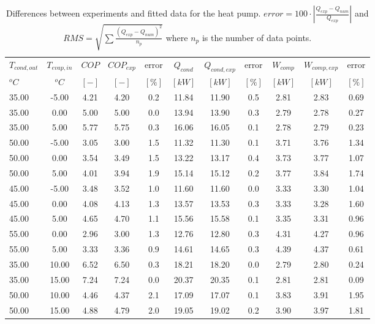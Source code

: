 \documentclass[english]{SPFShortReport}
\begin{document}
\begin{table}[!ht]
\begin{small}
\caption{Differences between experiments and fitted data for the heat pump.          $error=100 \cdot |\frac{Q_{exp}-Q_{num}}{Q_{exp}}|$ and $RMS = \sqrt { \sum{\frac{(Q_{exp}-Q_{num})^2}{n_p}} }$ where $n_p$ is the number of data points.}
\begin{center}
\resizebox{12cm}{!} 
{
\begin{tabular}{l | c c c c c c c c c c } 
\hline
\hline
$T_{cond,out}$ &$T_{evap,in}$ &$COP$ &$COP_{exp}$ &error &$Q_{cond}$ &$Q_{cond,exp}$ &error &$W_{comp}$ &$W_{comp,exp}$ &error \\ 
$^oC$ &$^oC$ &$[-]$ &$[-]$ &$[\%]$ &$[kW]$ &$[kW]$ &$[\%]$ &$[kW]$ &$[kW]$ &$[\%]$\\ 
\hline
35.00  & -5.00 & 4.21 & 4.20 & 0.2 & 11.84 & 11.90 & 0.5 & 2.81 & 2.83 & 0.69\\ 
35.00  & 0.00 & 5.00 & 5.00 & 0.0 & 13.94 & 13.90 & 0.3 & 2.79 & 2.78 & 0.27\\ 
35.00  & 5.00 & 5.77 & 5.75 & 0.3 & 16.06 & 16.05 & 0.1 & 2.78 & 2.79 & 0.23\\ 
50.00  & -5.00 & 3.05 & 3.00 & 1.5 & 11.32 & 11.30 & 0.1 & 3.71 & 3.76 & 1.34\\ 
50.00  & 0.00 & 3.54 & 3.49 & 1.5 & 13.22 & 13.17 & 0.4 & 3.73 & 3.77 & 1.07\\ 
50.00  & 5.00 & 4.01 & 3.94 & 1.9 & 15.14 & 15.12 & 0.2 & 3.77 & 3.84 & 1.74\\ 
45.00  & -5.00 & 3.48 & 3.52 & 1.0 & 11.60 & 11.60 & 0.0 & 3.33 & 3.30 & 1.04\\ 
45.00  & 0.00 & 4.08 & 4.13 & 1.3 & 13.57 & 13.53 & 0.3 & 3.33 & 3.28 & 1.60\\ 
45.00  & 5.00 & 4.65 & 4.70 & 1.1 & 15.56 & 15.58 & 0.1 & 3.35 & 3.31 & 0.96\\ 
55.00  & 0.00 & 2.96 & 3.00 & 1.3 & 12.76 & 12.80 & 0.3 & 4.31 & 4.27 & 0.96\\ 
55.00  & 5.00 & 3.33 & 3.36 & 0.9 & 14.61 & 14.65 & 0.3 & 4.39 & 4.37 & 0.61\\ 
35.00  & 10.00 & 6.52 & 6.50 & 0.3 & 18.21 & 18.20 & 0.0 & 2.79 & 2.80 & 0.24\\ 
35.00  & 15.00 & 7.24 & 7.24 & 0.0 & 20.37 & 20.35 & 0.1 & 2.81 & 2.81 & 0.09\\ 
50.00  & 10.00 & 4.46 & 4.37 & 2.1 & 17.09 & 17.07 & 0.1 & 3.83 & 3.91 & 1.95\\ 
50.00  & 15.00 & 4.88 & 4.79 & 2.0 & 19.05 & 19.02 & 0.2 & 3.90 & 3.97 & 1.81\\ 

\end{tabular}}
\end{center}
\end{small}
\end{table}
\end{document}
